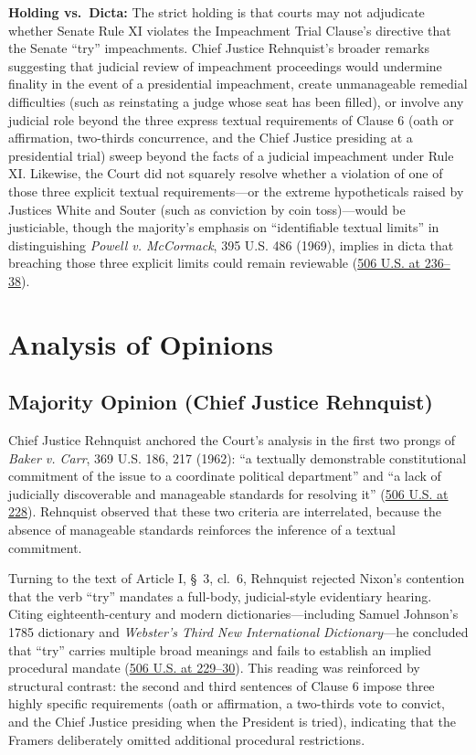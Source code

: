 \documentclass[12pt]{article}
\begin{document}
\textbf{Holding vs.\ Dicta:} The strict holding is that courts may not adjudicate whether Senate Rule XI violates the Impeachment Trial Clause's directive that the Senate ``try'' impeachments. Chief Justice Rehnquist's broader remarks suggesting that judicial review of impeachment proceedings would undermine finality in the event of a presidential impeachment, create unmanageable remedial difficulties (such as reinstating a judge whose seat has been filled), or involve any judicial role beyond the three express textual requirements of Clause 6 (oath or affirmation, two-thirds concurrence, and the Chief Justice presiding at a presidential trial) sweep beyond the facts of a judicial impeachment under Rule XI. Likewise, the Court did not squarely resolve whether a violation of one of those three explicit textual requirements---or the extreme hypotheticals raised by Justices White and Souter (such as conviction by coin toss)---would be justiciable, though the majority's emphasis on ``identifiable textual limits'' in distinguishing \textit{Powell v. McCormack}, 395 U.S. 486 (1969), implies in dicta that breaching those three explicit limits could remain reviewable (\href{https://supreme.justia.com/cases/federal/us/506/224/}{506 U.S. at 236--38}).

\section{Analysis of Opinions}

\subsection{Majority Opinion (Chief Justice Rehnquist)}

Chief Justice Rehnquist anchored the Court's analysis in the first two prongs of \textit{Baker v. Carr}, 369 U.S. 186, 217 (1962): ``a textually demonstrable constitutional commitment of the issue to a coordinate political department'' and ``a lack of judicially discoverable and manageable standards for resolving it'' (\href{https://supreme.justia.com/cases/federal/us/506/224/}{506 U.S. at 228}). Rehnquist observed that these two criteria are interrelated, because the absence of manageable standards reinforces the inference of a textual commitment.

Turning to the text of Article I, \S~3, cl.\ 6, Rehnquist rejected Nixon's contention that the verb ``try'' mandates a full-body, judicial-style evidentiary hearing. Citing eighteenth-century and modern dictionaries---including Samuel Johnson's 1785 dictionary and \textit{Webster's Third New International Dictionary}---he concluded that ``try'' carries multiple broad meanings and fails to establish an implied procedural mandate (\href{https://supreme.justia.com/cases/federal/us/506/224/}{506 U.S. at 229--30}). This reading was reinforced by structural contrast: the second and third sentences of Clause 6 impose three highly specific requirements (oath or affirmation, a two-thirds vote to convict, and the Chief Justice presiding when the President is tried), indicating that the Framers deliberately omitted additional procedural restrictions.
\end{document}
